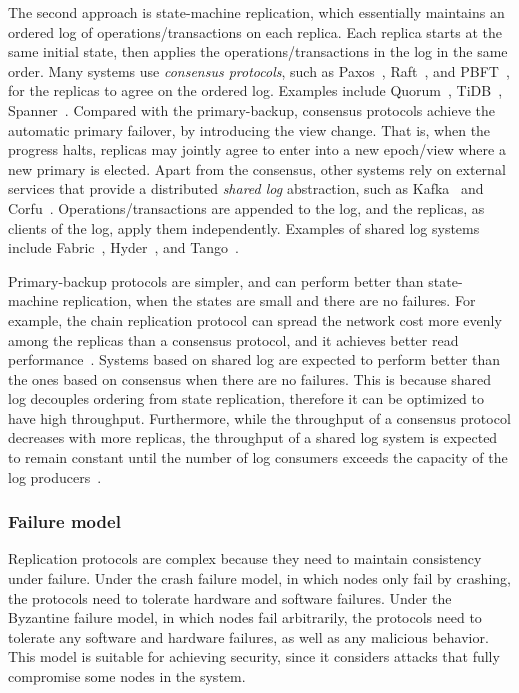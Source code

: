 The second approach is state-machine replication, which essentially maintains an
ordered log of operations/transactions on each replica. Each replica starts at
the same initial state, then applies the operations/transactions in the log in
the same order. Many systems use {\em consensus protocols}, such as
Paxos~\cite{lamport2001paxos}, Raft~\cite{raft}, and
PBFT~\cite{castro1999practical}, for the replicas to agree on the ordered log.
Examples include Quorum~\cite{web:quorum}, TiDB~\cite{web:tidb},
Spanner~\cite{corbett2013spanner}.
Compared with the primary-backup, consensus protocols achieve the automatic
primary failover, by introducing the view change. That is, when the progress
halts, replicas may jointly agree to enter into a new epoch/view where a new
primary is elected.
Apart from the consensus, other systems rely on external services that provide a
distributed {\em shared log} abstraction, such as Kafka~\cite{web:kafka} and
Corfu~\cite{corfu}. Operations/transactions are appended to the log, and the
replicas, as clients of the log, apply them independently.
Examples of shared log systems include Fabric~\cite{web:fabric},
Hyder~\cite{hyder}, and Tango~\cite{tango}.

Primary-backup protocols are simpler, and can perform better than state-machine
replication, when the states are small and there are no failures. For example,
the chain replication protocol can spread the network cost more evenly among the
replicas than a consensus protocol, and it achieves better read
performance~\cite{replex}. Systems based on shared log are expected to perform
better than the ones based on consensus when there are no failures.  This is
because shared log decouples ordering from state replication, therefore it can
be optimized to have high throughput. Furthermore, while the throughput of a
consensus protocol decreases with more replicas, the throughput of a shared log
system is expected to remain constant until the number of log consumers exceeds
the capacity of the log producers~\cite{corfu}. 
 
\subsubsection{Failure model}
\label{sec:twin:taxonomy:replication:failure}
Replication protocols are complex because they need to maintain consistency
under failure. Under the crash failure model, in which nodes only fail by
crashing, the protocols need to tolerate hardware and software failures. Under
the Byzantine failure model, in which nodes fail arbitrarily, the protocols need
to tolerate any software and hardware failures, as well as any malicious
behavior. This model is suitable for achieving security, since it considers
attacks that fully compromise some nodes in the system.


